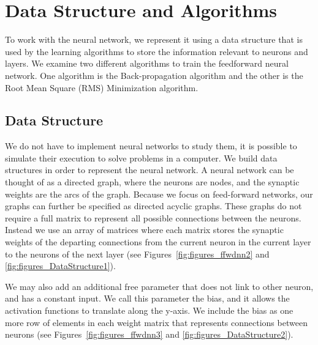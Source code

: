 \documentclass[11pt]{article}
\begin{document}


\section{Data Structure and Algorithms} %
\label{sec:data_structure_and_algorithms}

To work with the neural network, we represent it using a data structure that is used by the learning algorithms to store the information
relevant to neurons and layers. We examine two different algorithms to train the feedforward neural network. One algorithm is the
Back-propagation algorithm and the other is the Root Mean Square (RMS) Minimization algorithm.

\subsection{Data Structure} %
\label{sub:data_structure}

We do not have to implement neural networks to study them, it is possible to simulate their execution to solve problems in a computer.
We build data structures in order to represent the neural network. A neural network can be thought of as a directed graph, where the
neurons are nodes, and the synaptic weights are the arcs of the graph. Because we focus on feed-forward networks, our graphs can further
be specified as directed acyclic graphs. These graphs do not require a full matrix to represent all possible connections between the
neurons. Instead we use an array of matrices where each matrix stores the synaptic weights of the departing connections from the current
neuron in the current layer to the neurons of the next layer (see Figures~\ref{fig:figures_ffwdnn2} and
\ref{fig:figures_DataStructure1}).

We may also add an additional free parameter that does not link to other neuron, and has a constant input. We call this parameter the
bias, and it allows the activation functions to translate along the y-axis. We include the bias as one more row of elements in each
weight matrix that represents connections between neurons (see Figures~\ref{fig:figures_ffwdnn3} and \ref{fig:figures_DataStructure2}).
\end{document}
